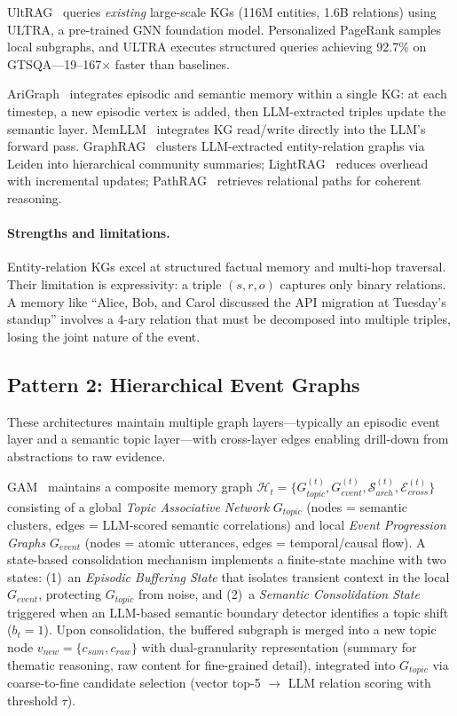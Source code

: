 \documentclass[hf]{ceurart}
\begin{document}
UltRAG~\cite{ultrag2026} queries \emph{existing} large-scale KGs
(116M entities, 1.6B relations) using ULTRA, a pre-trained GNN
foundation model. Personalized PageRank samples local subgraphs, and
ULTRA executes structured queries achieving 92.7\% on
GTSQA---19--167$\times$ faster than baselines.

AriGraph~\cite{arigraph2025} integrates episodic and semantic memory
within a single KG: at each timestep, a new episodic vertex is added,
then LLM-extracted triples update the semantic layer.
MemLLM~\cite{memllm2025} integrates KG read/write directly into the
LLM's forward pass. GraphRAG~\cite{graphrag2024} clusters
LLM-extracted entity-relation graphs via Leiden into hierarchical
community summaries; LightRAG~\cite{lightrag2025} reduces overhead
with incremental updates; PathRAG~\cite{pathrag2025} retrieves
relational paths for coherent reasoning.

\paragraph{Strengths and limitations.}
Entity-relation KGs excel at structured factual memory and multi-hop
traversal. Their limitation is expressivity: a triple $(s, r, o)$
captures only binary relations. A memory like ``Alice, Bob, and Carol
discussed the API migration at Tuesday's standup'' involves a 4-ary
relation that must be decomposed into multiple triples, losing the
joint nature of the event.

\subsection{Pattern 2: Hierarchical Event Graphs}

These architectures maintain multiple graph layers---typically an
episodic event layer and a semantic topic layer---with cross-layer
edges enabling drill-down from abstractions to raw evidence.

GAM~\cite{gam2026} maintains a composite memory graph
$\mathcal{H}_t = \{G_{topic}^{(t)}, G_{event}^{(t)}, \mathcal{S}_{arch}^{(t)},
\mathcal{E}_{cross}^{(t)}\}$ consisting of a global \emph{Topic Associative
Network} $G_{topic}$ (nodes = semantic clusters, edges = LLM-scored
semantic correlations) and local \emph{Event Progression Graphs}
$G_{event}$ (nodes = atomic utterances, edges = temporal/causal flow).
A state-based consolidation mechanism implements a finite-state machine
with two states: (1)~an \emph{Episodic Buffering State} that isolates
transient context in the local $G_{event}$, protecting $G_{topic}$ from
noise, and (2)~a \emph{Semantic Consolidation State} triggered when an
LLM-based semantic boundary detector identifies a topic shift ($b_t = 1$).
Upon consolidation, the buffered subgraph is merged into a new topic node
$v_{new} = \{c_{sum}, c_{raw}\}$ with dual-granularity representation
(summary for thematic reasoning, raw content for fine-grained detail),
integrated into $G_{topic}$ via coarse-to-fine candidate selection
(vector top-5 $\rightarrow$ LLM relation scoring with threshold $\tau$).
\end{document}
